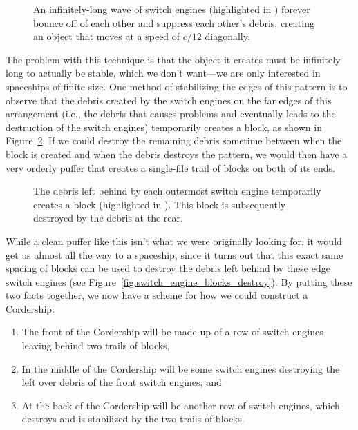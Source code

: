 \begin{figure}[!htb]
	\centering{}
	\caption{An infinitely-long wave of switch engines (highlighted in ) forever bounce off of each other and suppress each other's debris, creating an object that moves at a speed of $c/12$ diagonally.}\label{fig:switch_engine_infinite}
\end{figure}

The problem with this technique is that the object it creates must be infinitely long to actually be stable, which we don't want---we are only interested in spaceships of finite size. One method of stabilizing the edges of this pattern is to observe that the debris created by the switch engines on the far edges of this arrangement (i.e., the debris that causes problems and eventually leads to the destruction of the switch engines) temporarily creates a block, as shown in Figure~\ref{fig:switch_engine_blocks}. If we could destroy the remaining debris sometime between when the block is created and when the debris destroys the pattern, we would then have a very orderly puffer that creates a single-file trail of blocks on both of its ends.

\begin{figure}[!htb]
	\centering{}
	\caption{The debris left behind by each outermost switch engine temporarily creates a block (highlighted in ). This block is subsequently destroyed by the debris at the rear.}\label{fig:switch_engine_blocks}
\end{figure}

While a clean puffer like this isn't what we were originally looking for, it would get us almost all the way to a spaceship, since it turns out that this exact same spacing of blocks can be used to destroy the debris left behind by these edge switch engines (see Figure~\ref{fig:switch_engine_blocks_destroy}). By putting these two facts together, we now have a scheme for how we could construct a Cordership:\smallskip

\begin{enumerate}
	\item[1)] The front of the Cordership will be made up of a row of switch engines leaving behind two trails of blocks,\smallskip
	
	\item[2)] In the middle of the Cordership will be some switch engines destroying the left over debris of the front switch engines, and\smallskip
	
	\item[3)] At the back of the Cordership will be another row of switch engines, which destroys and is stabilized by the two trails of blocks.\smallskip
\end{enumerate}

